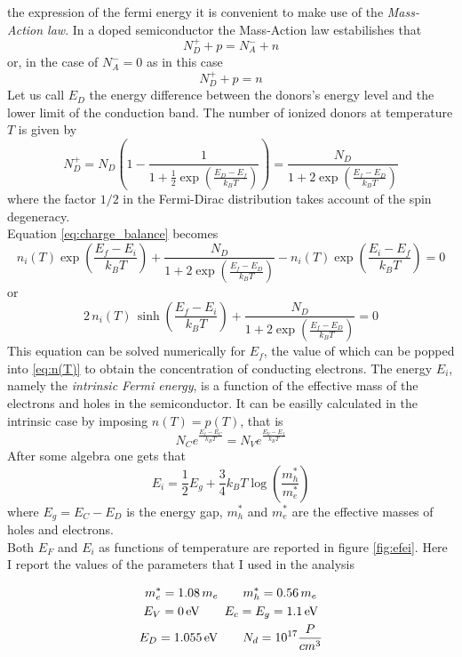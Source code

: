 \documentclass{article}
\begin{document}
the expression of the fermi energy it is convenient to make use of the \emph{Mass-Action law}. In a doped semiconductor the Mass-Action law estabilishes that
\begin{equation*}
    N_D^+ + p = N_A^- + n
\end{equation*}
or, in the case of $N_A^- = 0$ as in this case 
\begin{equation}
    N_D^+ + p = n
    \label{eq:charge_balance}
\end{equation}
Let us call $E_D$ the energy difference between the donors's energy level and the lower limit of the conduction band.
The number of ionized donors at temperature $T$ is given by
\begin{equation*}
    N_D^+ = N_D \left(1 - \frac{1}{1+\frac{1}{2}\exp\left(\frac{E_D-E_f}{k_BT}\right)}\right) = \frac{N_D}{1 + 2\exp\left(\frac{E_f-E_D}{k_BT}\right)}
\end{equation*}
where the factor $1/2$ in the Fermi-Dirac distribution takes account of the spin degeneracy. \\
Equation \ref{eq:charge_balance} becomes 
\begin{equation*}
    n_i(T)\exp\left(\frac{E_f-E_i}{k_BT}\right) + \frac{N_D}{1 + 2\exp\left(\frac{E_f-E_D}{k_BT}\right)} - n_i(T)\exp\left(\frac{E_i-E_f}{k_BT}\right) = 0
\end{equation*}
or 
\begin{equation*}
    2 \, n_i(T) \, \sinh\left(\frac{E_f-E_i}{k_BT}\right) + \frac{N_D}{1 + 2\exp\left(\frac{E_f-E_D}{k_BT}\right)} = 0
\end{equation*}
This equation can be solved numerically for $E_f$, the value of which can be popped into \ref{eq:n(T)} to obtain the concentration of conducting electrons.
The energy $E_i$, namely the \emph{intrinsic Fermi energy}, is a function of the effective mass of the electrons and holes in the semiconductor. It can be easilly calculated
in the intrinsic case by imposing $n(T) = p(T)$, that is 
\begin{equation*}
    N_C e^{\frac{E_{f}-E_C}{k_B T}} = N_V e^{\frac{E_V- E_{f}}{k_B T}}
\end{equation*}
After some algebra one gets that 
\begin{equation*}
    E_i = \frac{1}{2}E_g + \frac{3}{4}k_BT\log\left(\frac{m_h^*}{m_e^*}\right)
\end{equation*}
where $E_g = E_C - E_D$ is the energy gap, $m_h^*$ and $m_e^*$ are the effective masses of holes and electrons. \\
Both $E_F$ and $E_i$ as functions of temperature are reported in figure \ref{fig:efei}. Here I report the values of the parameters that I used in the analysis
\begin{center}\begin{gather*}
    m_e^* = 1.08 \, m_e \qquad m_h^* = 0.56 \, m_e \\
    E_V = \SI{0}{\electronvolt} \qquad E_c = E_g = \SI{1.1}{eV} \\
    E_D = \SI{1.055}{\electronvolt} \qquad N_d = 10^{17} \small{\frac{P}{cm^3}} 
\end{gather*}\end{center}
\end{document}
